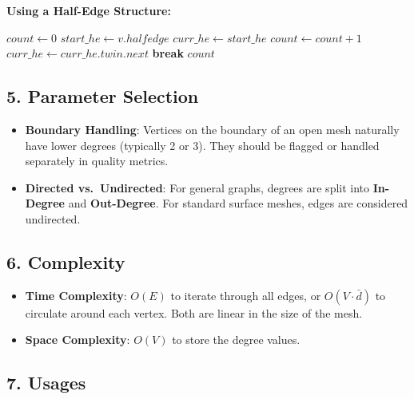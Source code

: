 \textbf{Using a Half-Edge Structure:}

\begin{algorithm}
\caption{Get Vertex Degree}
\label{alg:get_vertex_degree}
\begin{algorithmic}[1]
    \State $\mathit{count} \gets 0$
    \State $\mathit{start\_he} \gets v.\mathit{halfedge}$
    \State $\mathit{curr\_he} \gets \mathit{start\_he}$
    \Loop
        \State $\mathit{count} \gets \mathit{count} + 1$
        \State $\mathit{curr\_he} \gets \mathit{curr\_he}.\mathit{twin}.\mathit{next}$
            \State \textbf{break}
        \EndIf
    \EndLoop
    \State \Return $\mathit{count}$
\EndFunction
\end{algorithmic}
\end{algorithm}

\subsection{5. Parameter Selection}

\begin{itemize}
    \item \textbf{Boundary Handling}: Vertices on the boundary of an open mesh naturally have lower degrees (typically 2 or 3). They should be flagged or handled separately in quality metrics.
    \item \textbf{Directed vs.\ Undirected}: For general graphs, degrees are split into \textbf{In-Degree} and \textbf{Out-Degree}. For standard surface meshes, edges are considered undirected.
\end{itemize}

\subsection{6. Complexity}

\begin{itemize}
    \item \textbf{Time Complexity}: $O(E)$ to iterate through all edges, or $O(V \cdot \bar{d})$ to circulate around each vertex. Both are linear in the size of the mesh.
    \item \textbf{Space Complexity}: $O(V)$ to store the degree values.
\end{itemize}

\subsection{7. Usages}

